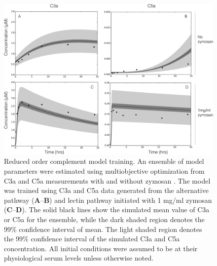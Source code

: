 \documentclass[12pt]{article}
\begin{document}
\begin{figure}[h]
\centering
\includegraphics[width=1.0\textwidth]{./figs/Figure2_Fits_final_v2.pdf}
\caption{Reduced order complement model training.
An ensemble of model parameters were estimated using multiobjective optimization from C3a and C5a measurements with and without zymosan \cite{morad2015time}.
The model was trained using C3a and C5a data generated from the alternative pathway (\textbf{A}--\textbf{B}) and lectin pathway initiated with 1 mg/ml zymosan (\textbf{C}--\textbf{D}).
The solid black lines show the simulated mean value of C3a or C5a for the ensemble, while the dark shaded region denotes the 99\% confidence interval of mean.
The light shaded region denotes the 99\% confidence interval of the simulated C3a and C5a concentration.
All initial conditions were assumed to be at their physiological serum levels unless otherwise noted.
}\label{fig-fit}
\end{figure}
\end{document}
